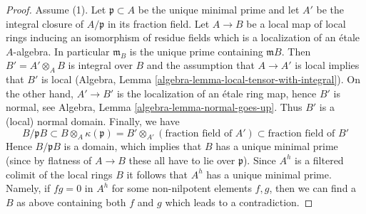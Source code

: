 \documentclass[10pt,a4paper]{amsart}
\theoremstyle{plain}
\theoremstyle{definition}
\theoremstyle{remark}
\numberwithin{equation}{subsection}
\begin{document}
\begin{proof}
\medskip\noindent
Assume (1). Let $\mathfrak p \subset A$ be the unique minimal
prime and let $A'$ be the integral closure of $A/\mathfrak p$
in its fraction field. Let $A \to B$ be a local map of local rings
inducing an isomorphism of residue fields which is a
localization of an \'etale $A$-algebra. In particular $\mathfrak m_B$
is the unique prime containing $\mathfrak m B$. Then $B' = A' \otimes_A B$
is integral over $B$ and the assumption that $A \to A'$ is local
implies that $B'$ is local
(Algebra, Lemma \ref{algebra-lemma-local-tensor-with-integral}).
On the other hand, $A' \to B'$ is the localization
of an \'etale ring map, hence $B'$ is normal, see
Algebra, Lemma \ref{algebra-lemma-normal-goes-up}.
Thus $B'$ is a (local) normal domain. Finally, we have
$$
B/\mathfrak pB \subset B \otimes_A \kappa(\mathfrak p)
= B' \otimes_{A'} (\text{fraction field of }A') \subset
\text{fraction field of }B'
$$
Hence $B/\mathfrak pB$ is a domain, which implies that $B$ has a unique
minimal prime (since by flatness of $A \to B$ these all have to lie
over $\mathfrak p$). Since $A^h$ is a filtered colimit of
the local rings $B$ it follows that $A^h$ has a unique minimal prime.
Namely, if $fg = 0$ in $A^h$ for some non-nilpotent elements
$f, g$, then we can find a $B$ as above containing both $f$ and $g$
which leads to a contradiction.
\end{proof}
\end{document}
